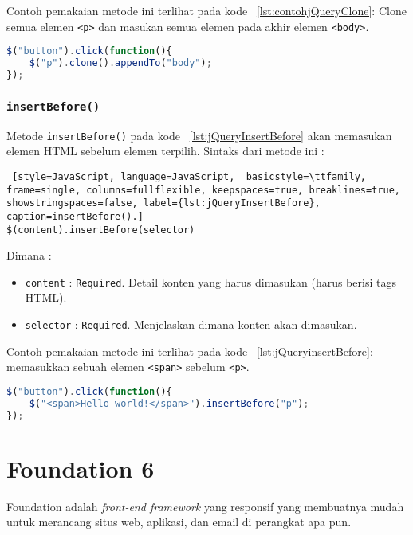 Contoh pemakaian metode ini terlihat pada kode ~\ref{lst:contohjQueryClone}: Clone semua elemen \texttt{<p>} dan masukan semua elemen pada akhir elemen \texttt{<body>}.
\begin{lstlisting}[style=JavaScript, language=JavaScript,  basicstyle=\ttfamily, frame=single, columns=fullflexible, keepspaces=true, breaklines=true, showstringspaces=false, label={lst:contohjQueryClone}, caption=contoh jQuery clone().]
$("button").click(function(){
	$("p").clone().appendTo("body");
});
\end{lstlisting}


\subsubsection{\texttt{insertBefore()}}
Metode \texttt{insertBefore()} pada kode ~\ref{lst:jQueryInsertBefore} akan memasukan elemen HTML sebelum elemen terpilih.
Sintaks dari metode ini :
\begin{lstlisting} [style=JavaScript, language=JavaScript,  basicstyle=\ttfamily, frame=single, columns=fullflexible, keepspaces=true, breaklines=true, showstringspaces=false, label={lst:jQueryInsertBefore}, caption=insertBefore().]
$(content).insertBefore(selector)
\end{lstlisting}
Dimana :
\begin{itemize}
	\item \texttt{content} : \texttt{Required}. Detail konten yang harus dimasukan (harus berisi tags HTML).
	\item \texttt{selector} : \texttt{Required}. Menjelaskan dimana konten akan dimasukan. 
\end{itemize}

Contoh pemakaian metode ini terlihat pada kode ~\ref{lst:jQueryinsertBefore}: memasukkan sebuah elemen \texttt{<span>} sebelum \texttt{<p>}.
\begin{lstlisting}[style=JavaScript, language=JavaScript,  basicstyle=\ttfamily, frame=single, columns=fullflexible, keepspaces=true, breaklines=true, showstringspaces=false, label={lst:jQueryinsertBefore}, caption=jQuery insertBefore().]
$("button").click(function(){
	$("<span>Hello world!</span>").insertBefore("p");
});
\end{lstlisting}

\section{Foundation 6}
\label{sec:foundation}
Foundation adalah \textit{front-end framework} yang responsif yang membuatnya mudah untuk merancang situs web, aplikasi, dan email di perangkat apa pun.

